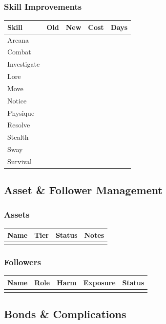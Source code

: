 \subsubsection*{Skill Improvements}
\begin{tabular}{|l|c|c|c|c|}
\hline
\textbf{Skill} & \textbf{Old} & \textbf{New} & \textbf{Cost} & \textbf{Days} \\
\hline
Arcana & & & & \\
Combat & & & & \\
Investigate & & & & \\
Lore & & & & \\
Move & & & & \\
Notice & & & & \\
Physique & & & & \\
Resolve & & & & \\
Stealth & & & & \\
Sway & & & & \\
Survival & & & & \\
\hline
\end{tabular}

\subsection{Asset \& Follower Management}
\subsubsection*{Assets}
\begin{tabular}{|l|c|c|c|}
\hline
\textbf{Name} & \textbf{Tier} & \textbf{Status} & \textbf{Notes} \\
\hline
 & & & \\
\hline
\end{tabular}

\subsubsection*{Followers}
\begin{tabular}{|l|c|c|c|c|}
\hline
\textbf{Name} & \textbf{Role} & \textbf{Harm} & \textbf{Exposure} & \textbf{Status} \\
\hline
 & & & & \\
\hline
\end{tabular}

\subsection{Bonds \& Complications}
